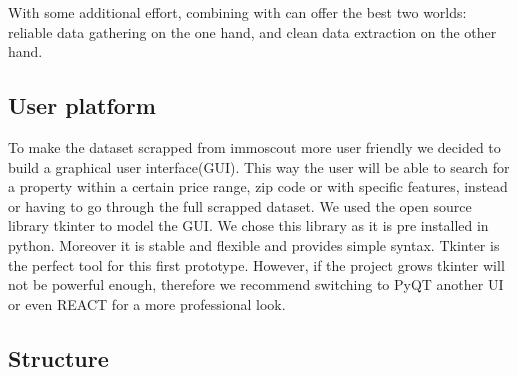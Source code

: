 \documentclass[main]{subfiles}
\begin{document}
With some additional effort, combining \selenium with \scrapy can offer the best two worlds: reliable data gathering on the one hand,
and clean data extraction on the other hand.




\subsection{User platform}
To make the dataset scrapped from immoscout more user friendly we decided to build a graphical user interface(GUI).
This way the user will be able to search for a property within a certain price range, zip code or with specific features, 
instead or having to go through the full scrapped dataset.
We used the open source library tkinter to model the GUI. We chose this library as it is pre installed in python.
Moreover it is stable and flexible and provides simple syntax.
Tkinter is the perfect tool for this first prototype. However, if the project grows tkinter will not be powerful enough,
therefore we recommend switching to PyQT another UI or even REACT for a more professional look. 


\subsection{Structure}
\end{document}
